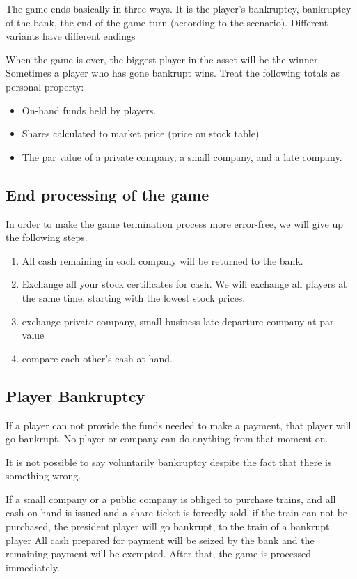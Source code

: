 \documentclass{article}
\begin{document}
\begin{CJK}{UTF8}{min}
The game ends basically in three ways. It is the player's bankruptcy,
bankruptcy of the bank, the end of the game turn (according to the
scenario). Different variants have different endings

When the game is over, the biggest player in the asset will be the
winner. Sometimes a player who has gone bankrupt wins. Treat the
following totals as personal property:

\begin{itemize}
\item On-hand funds held by players.
\item Shares calculated to market price (price on stock table)
\item The par value of a private company, a small company, and a late company.
\end{itemize}

\subsection{End processing of the game}

In order to make the game termination process more error-free, we will
give up the following steps.

\begin{enumerate}
\item All cash remaining in each company will be returned to the bank.
\item Exchange all your stock certificates for cash. We will exchange
  all players at the same time, starting with the lowest stock prices.
\item exchange private company, small business late departure company
  at par value
\item compare each other's cash at hand.
\end{enumerate}

\subsection{Player Bankruptcy}

If a player can not provide the funds needed to make a payment, that
player will go bankrupt. No player or company can do anything from
that moment on.

It is not possible to say voluntarily bankruptcy despite the fact that
there is something wrong.

If a small company or a public company is obliged to purchase trains,
and all cash on hand is issued and a share ticket is forcedly sold, if
the train can not be purchased, the president player will go bankrupt,
to the train of a bankrupt player All cash prepared for payment will
be seized by the bank and the remaining payment will be
exempted. After that, the game is processed immediately.


\end{CJK}
\end{document}
